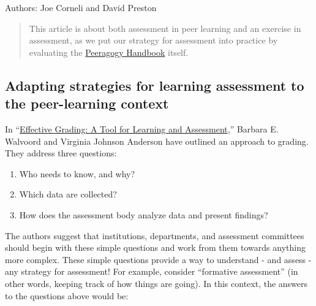 Authors: Joe Corneli and David Preston

\begin{quote}
This article is about both assessment in peer learning and an exercise
in assessment, as we put our strategy for assessment into practice by
evaluating the \href{http://peeragogy.org}{Peeragogy Handbook} itself.
\end{quote}


\subsection{Adapting strategies for learning assessment to the
peer-learning context}

In
``\href{http://books.google.com/books?id=EJxy06yX\_NoC\&printsec=frontcover\&source=gbs\_atb\#v=onepage\&q\&f=false}{Effective
Grading: A Tool for Learning and Assessment},'' Barbara E. Walvoord and
Virginia Johnson Anderson have outlined an approach to grading. They
address three questions:

\begin{enumerate}
\item
  Who needs to know, and why?
\item
  Which data are collected?
\item
  How does the assessment body analyze data and present findings?
\end{enumerate}
The authors suggest that institutions, departments, and assessment
committees should begin with these simple questions and work from them
towards anything more complex. These simple questions provide a way to
understand - and assess - any strategy for assessment! For example,
consider ``formative assessment'' (in other words, keeping track of how
things are going). In this context, the answers to the questions above
would be:

